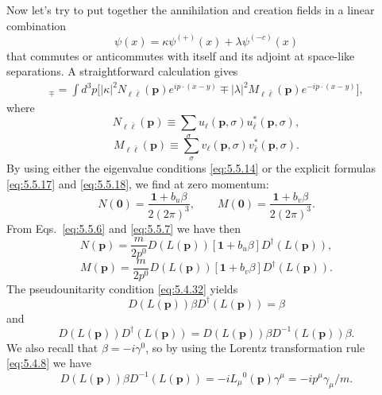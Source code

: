 Now let's try to put together the annihilation and creation fields in a linear
combination
\begin{equation}
\psi(x)=\kappa\psi^{(+)}(x)+\lambda\psi^{(-c)}(x)
\tag{5.5.19}\label{eq:5.5.19}
\end{equation}
that commutes or anticommutes with itself and its adjoint at space-like
separations. A straightforward calculation gives
\begin{align}
[\psi_\ell(x),\psi_{\bar\ell}^\dagger(y)]_\mp
=\int d^3p\bigl[|\kappa|^2N_{\ell\bar\ell}(\mathbf p)e^{ip\cdot(x-y)}
\mp|\lambda|^2M_{\ell\bar\ell}(\mathbf p)e^{-ip\cdot(x-y)}\bigr],
\tag{5.5.20}\label{eq:5.5.20}
\end{align}
where
\begin{equation}
N_{\ell\bar\ell}(\mathbf p)\equiv
\sum_\sigma u_\ell(\mathbf p,\sigma)u_{\bar\ell}^*(\mathbf p,\sigma),
\tag{5.5.21}\label{eq:5.5.21}
\end{equation}
\begin{equation}
M_{\ell\bar\ell}(\mathbf p)\equiv
\sum_\sigma v_\ell(\mathbf p,\sigma)v_{\bar\ell}^*(\mathbf p,\sigma).
\tag{5.5.22}\label{eq:5.5.22}
\end{equation}
By using either the eigenvalue conditions \eqref{eq:5.5.14} or the explicit formulas
\eqref{eq:5.5.17} and \eqref{eq:5.5.18}, we find at zero momentum:
\begin{equation}
N(\mathbf0)=\frac{\mathbf{1}+b_u\beta}{2(2\pi)^3},
\qquad
M(\mathbf0)=\frac{\mathbf{1}+b_v\beta}{2(2\pi)^3}.
\tag{5.5.23}\label{eq:5.5.23}
\end{equation}
From Eqs.~\eqref{eq:5.5.6} and \eqref{eq:5.5.7} we have then
\begin{equation}
N(\mathbf p)=\frac{m}{2p^0}D(L(\mathbf p))
[\mathbf{1}+b_u\beta]D^\dagger(L(\mathbf p)),
\tag{5.5.24}\label{eq:5.5.24}
\end{equation}
\begin{equation}
M(\mathbf p)=\frac{m}{2p^0}D(L(\mathbf p))
[\mathbf{1}+b_v\beta]D^\dagger(L(\mathbf p)).
\tag{5.5.25}\label{eq:5.5.25}
\end{equation}
The pseudounitarity condition \eqref{eq:5.4.32} yields
\[
D(L(\mathbf p))\beta D^\dagger(L(\mathbf p))=\beta
\]
and
\[
D(L(\mathbf p))D^\dagger(L(\mathbf p))
=D(L(\mathbf p))\beta D^{-1}(L(\mathbf p))\beta.
\]
We also recall that $\beta=-i\gamma^0$, so by using the Lorentz transformation
rule \eqref{eq:5.4.8} we have
\begin{equation}
D(L(\mathbf p))\beta D^{-1}(L(\mathbf p))
=-iL_\mu{}^0(\mathbf p)\gamma^\mu=-ip^\mu\gamma_\mu/m.
\tag{5.5.26}\label{eq:5.5.26}
\end{equation}
